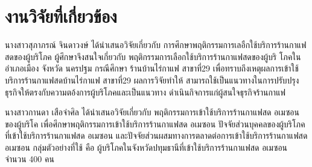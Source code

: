           \section{งานวิจัยที่เกี่ยวข้อง}
          นางสาวสุภาภรณ์ จินดาวงษ์ ได้นำเสนอวิจัยเกี่ยวกับ การศึกษาพฤติกรรมการเลอืกใช้บริการร้านกาแฟสดของผู้บริโภค ผู้ศึกษาจึงสนใจเกี่ยวกับ พฤติกรรมการเลือกใช้บริการร้านกาแฟสดของผู้บริ โภคในอำเภอเมือง จังหวัด นครปฐม กรณีศึกษา ร้านบ้านไร่กาแฟ สาขาที่29 เพื่อทราบถึงเหตุผลการเข้าใช้บริการร้านกาแฟสดบ้านไร่กาแฟ สาขาที่29 ผลการวิจัยทำให้
          สามารถใช้เป็นแนวทางในการปรับปรุงธุรกิจให้ตรงกับความตอ้งการผู้บริโภคและเป็นแนวทาง
          ดำเนินกิจการแก่ผู้สนใจธุรกิจร้านกาแฟ
		  
		  	
		  นางสาวกานดา เสือจำศิล ได้นำเสนอวิจัยเกี่ยวกับ พฤติกรรมการเข้าใช้บริการร้านกาแฟสด อเมซอน ของผู้บริโค เพื่อศึกษาพฤติกรรมการเข้าใช้บริการร้านกาแฟสด อเมซอน ปัจจัยส่วนบุคคลของผู้บริโภคที่เข้าใช้บริการร้านกาแฟสด อเมซอน และปัจจัยส่วนผสมทางการตลาดต่อการเข้าใช้บริการร้านกาแฟสด อเมซอน กลุ่มตัวอย่างที่ใช้ คือ ผู้บริโภคในจังหวัดปทุมธานีที่เข้าใช้บริการร้านกาแฟสด อเมซอน จำนวน 400 คน
		  \newline
		  	

	
